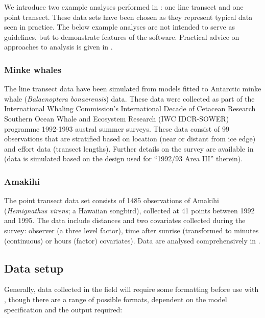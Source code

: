 \documentclass[article]{jss}
\begin{document}
We introduce two example analyses performed in : one line
transect and one point transect. These data sets have been chosen as
they represent typical data seen in practice. The below example analyses
are not intended to serve as guidelines, but to demonstrate features of
the software. Practical advice on approaches to analysis is given in
\citet{Thomas:2010cf}.

\subsubsection{Minke whales}\label{minke-whales}

The line transect data have been simulated from models fitted to
Antarctic minke whale (\emph{Balaenoptera bonaerensis}) data. These data
were collected as part of the International Whaling Commission's
International Decade of Cetacean Research Southern Ocean Whale and
Ecosystem Research (IWC IDCR-SOWER) programme 1992-1993 austral summer
surveys. These data consist of 99 observations that are stratified based
on location (near or distant from ice edge) and effort data (transect
lengths). Further details on the survey are available in
\citet{Branch:2001ua} (data is simulated based on the design used for
``1992/93 Area III'' therein).

\subsubsection{Amakihi}\label{amakihi}

The point transect data set consists of 1485 observations of Amakihi
(\emph{Hemignathus virens}; a Hawaiian songbird), collected at 41 points
between 1992 and 1995. The data include distances and two covariates
collected during the survey: observer (a three level factor), time after
sunrise (transformed to minutes (continuous) or hours (factor)
covariates). Data are analysed comprehensively in
\citet{Marques:2007ey}.

\subsection{Data setup}\label{data-setup}

Generally, data collected in the field will require some formatting
before use with , though there are a range of possible
formats, dependent on the model specification and the output required:
\end{document}

